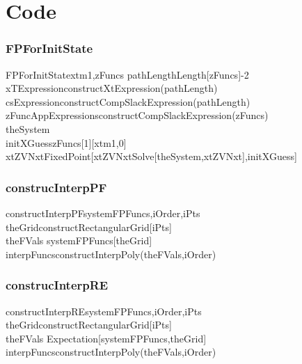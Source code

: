 \documentclass{beamer}
\begin{document}
\section{Code}
\begin{frame}
\frametitle{FPForInitState}
\label{sec:code}

\begin{pseudocode}{FPForInitState}{xtm1,zFuncs}
pathLength\GETS Length[zFuncs]-2\\
xTExpression\GETS constructXtExpression(pathLength)\\
csExpression\GETS constructCompSlackExpression(pathLength)\\
zFuncAppExpressions\GETS constructCompSlackExpression(zFuncs)\\
theSystem\\
initXGuess\GETS zFuncs[1][xtm1,0]\\
xtZVNxt\GETS FixedPoint[xtZVNxt\GETS Solve[theSystem,xtZVNxt],initXGuess]\\
\end{pseudocode}
\end{frame}


\begin{frame}
\frametitle{construcInterpPF}
\label{sec:code}

\begin{pseudocode}{constructInterpPF}{systemFPFuncs,iOrder,iPts}
theGrid\GETS constructRectangularGrid[iPts]\\
theFVals \GETS systemFPFuncs[theGrid]\\
interpFuncs\GETS constructInterpPoly(theFVals,iOrder)\\
\end{pseudocode}
\end{frame}


\begin{frame}
\frametitle{construcInterpRE}
\label{sec:code}

\begin{pseudocode}{constructInterpRE}{systemFPFuncs,iOrder,iPts}
theGrid\GETS constructRectangularGrid[iPts]\\
theFVals \GETS Expectation[systemFPFuncs,theGrid]\\
interpFuncs\GETS constructInterpPoly(theFVals,iOrder)\\
\end{pseudocode}
\end{frame}
\end{document}
